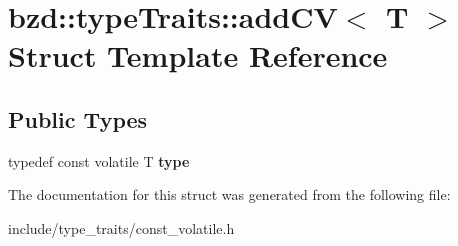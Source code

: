 \hypertarget{structbzd_1_1typeTraits_1_1addCV}{}\section{bzd\+:\+:type\+Traits\+:\+:add\+CV$<$ T $>$ Struct Template Reference}
\label{structbzd_1_1typeTraits_1_1addCV}
\subsection*{Public Types}
\begin{DoxyCompactItemize}
\item 
\mbox{\label{structbzd_1_1typeTraits_1_1addCV_abe3181609d19d9716a9825327945b531}} 
typedef const volatile T {\bfseries type}
\end{DoxyCompactItemize}


The documentation for this struct was generated from the following file\+:\begin{DoxyCompactItemize}
\item 
include/type\+\_\+traits/const\+\_\+volatile.\+h\end{DoxyCompactItemize}
